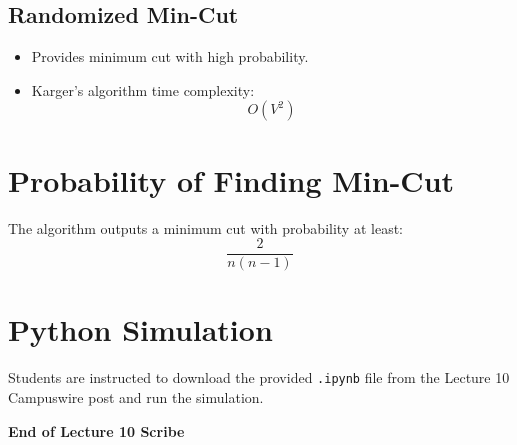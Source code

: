 \documentclass[12pt]{article}
\begin{document}
\subsection*{Randomized Min-Cut}
\begin{itemize}
    \item Provides minimum cut with high probability.
    \item Karger’s algorithm time complexity:
    \[
    O(V^2)
    \]
\end{itemize}

\section{Probability of Finding Min-Cut}

The algorithm outputs a minimum cut with probability at least:
\[
\frac{2}{n(n-1)}
\]

\section{Python Simulation}

Students are instructed to download the provided \texttt{.ipynb} file from the Lecture 10 Campuswire post and run the simulation.

\bigskip
\begin{center}
\textbf{End of Lecture 10 Scribe}
\end{center}
\end{document}
